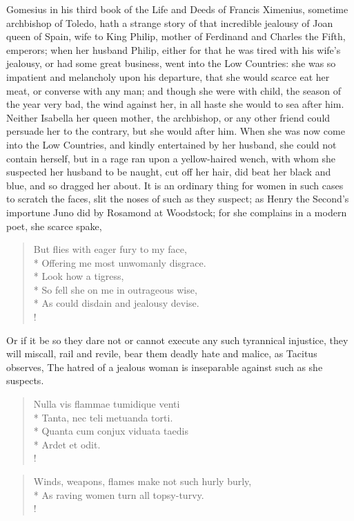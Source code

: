 Gomesius in his third book of the Life and Deeds of Francis Ximenius,
sometime archbishop of Toledo, hath a strange story of that incredible
jealousy of Joan queen of Spain, wife to King Philip, mother of
Ferdinand and Charles the Fifth, emperors; when her husband Philip,
either for that he was tired with his wife's jealousy, or had some
great business, went into the Low Countries: she was so impatient and
melancholy upon his departure, that she would scarce eat her meat, or
converse with any man; and though she were with child, the season of
the year very bad, the wind against her, in all haste she would to sea
after him. Neither Isabella her queen mother, the archbishop, or any
other friend could persuade her to the contrary, but she would after
him. When she was now come into the Low Countries, and kindly
entertained by her husband, she could not contain herself, but in
a rage ran upon a yellow-haired wench, with whom she suspected her
husband to be naught, cut off her hair, did beat her black and blue,
and so dragged her about. It is an ordinary thing for women in such
cases to scratch the faces, slit the noses of such as they suspect; as
Henry the Second's importune Juno did by Rosamond at Woodstock; for she
complains in a modern poet, she scarce spake,

\begin{verse}
But flies with eager fury to my face,\\*
Offering me most unwomanly disgrace.\\*
Look how a tigress, \etc{}\\*
So fell she on me in outrageous wise,\\*
As could disdain and jealousy devise.\\!
\end{verse}

Or if it be so they dare not or cannot execute any such tyrannical injustice,
they will miscall, rail and revile, bear them deadly hate and malice, as
Tacitus observes, The hatred of a jealous woman is
inseparable against such as she suspects.
%
\begin{latin}
\begin{verse}%
Nulla vis flammae tumidique venti\\*
Tanta, nec teli metuanda torti.\\*
Quanta cum conjux viduata taedis\\*
Ardet et odit.\\!
\end{verse}%
\end{latin}
\translationrule%
\begin{verse}%
Winds, weapons, flames make not such hurly burly,\\*
As raving women turn all topsy-turvy.\\!
\end{verse}%
%

